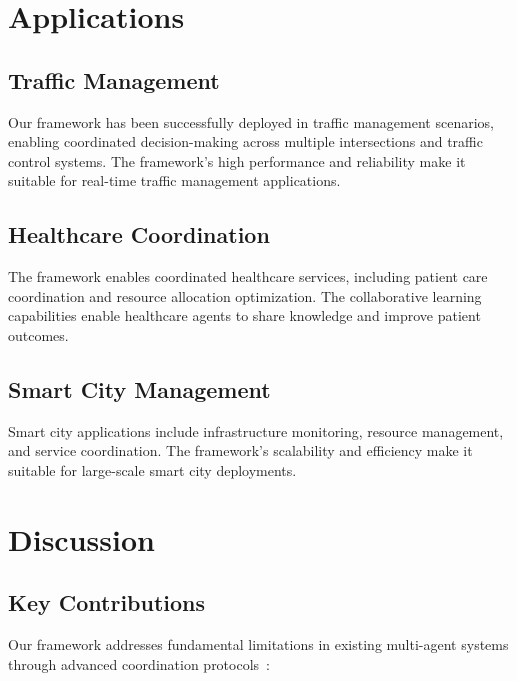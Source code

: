 \documentclass[conference]{IEEEtran}
\begin{document}
\section{Applications}

\subsection{Traffic Management}

Our framework has been successfully deployed in traffic management scenarios, enabling coordinated decision-making across multiple intersections and traffic control systems. The framework's high performance and reliability make it suitable for real-time traffic management applications.

\subsection{Healthcare Coordination}

The framework enables coordinated healthcare services, including patient care coordination and resource allocation optimization. The collaborative learning capabilities enable healthcare agents to share knowledge and improve patient outcomes.

\subsection{Smart City Management}

Smart city applications include infrastructure monitoring, resource management, and service coordination. The framework's scalability and efficiency make it suitable for large-scale smart city deployments.

\section{Discussion}

\subsection{Key Contributions}

Our framework addresses fundamental limitations in existing multi-agent systems through advanced coordination protocols~\cite{chen2025}:
\end{document}
